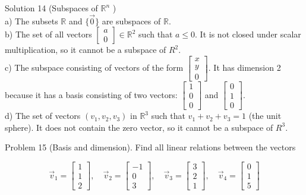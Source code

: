 \documentclass[10pt]{article}
\begin{document}
Solution 14 (Subspaces of $\mathbb{R}^{n}$ )\\
a) The subsets $\mathbb{R}$ and $\{\overrightarrow{0}\}$ are subspaces of $\mathbb{R}$.\\
b) The set of all vectors $\left[\begin{array}{l}a \\ 0\end{array}\right] \in \mathbb{R}^{2}$ such that $a \leq 0$. It is not closed under scalar multiplication, so it cannot be a subspace of $R^{2}$.\\
c) The subspace consisting of vectors of the form $\left[\begin{array}{l}x \\ y \\ 0\end{array}\right]$. It has dimension 2 because it has a basis consisting of two vectors: $\left[\begin{array}{l}1 \\ 0 \\ 0\end{array}\right]$ and $\left[\begin{array}{l}0 \\ 1 \\ 0\end{array}\right]$.\\
d) The set of vectors $\left(v_{1}, v_{2}, v_{3}\right)$ in $\mathbb{R}^{3}$ such that $v_{1}+v_{2}+v_{3}=1$ (the unit sphere). It does not contain the zero vector, so it cannot be a subspace of $R^{3}$.

Problem 15 (Basis and dimension). Find all linear relations between the vectors

$$
\vec{v}_{1}=\left[\begin{array}{l}
1 \\
1 \\
2
\end{array}\right], \quad \vec{v}_{2}=\left[\begin{array}{c}
-1 \\
0 \\
3
\end{array}\right], \quad \vec{v}_{3}=\left[\begin{array}{l}
3 \\
2 \\
1
\end{array}\right], \quad \vec{v}_{4}=\left[\begin{array}{l}
0 \\
1 \\
5
\end{array}\right]
$$
\end{document}
